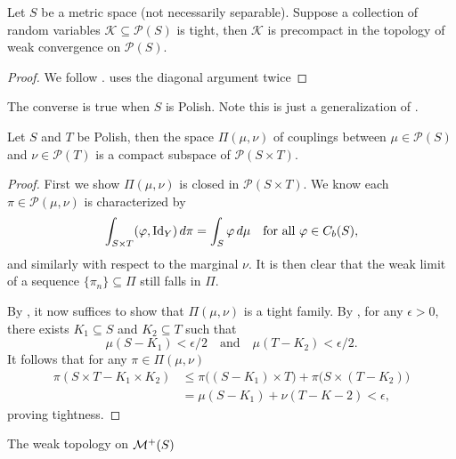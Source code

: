 \begin{namedthm} \label{label:Prohorov}
    Let $S$ be a metric space (not necessarily separable). Suppose a collection of random variables $\mathcal K \subseteq \mathcal P(S)$ is tight, then $\mathcal K$ is precompact in the topology of weak convergence on $\mathcal P(S)$.

    
\end{namedthm}
\begin{proof}
    We follow \cite[Theorem~23.2]{Kallenberg_2021}. \cite[Theorem~6.7]{DaPrato_2006} uses the diagonal argument twice 
\end{proof}

The converse is true when $S$ is Polish. Note this is just a generalization of .

\begin{cor} \cite[Corollary~2.9]{ABS_2024} \label{cor:compact-coupling-space-Polish}
    Let $S$ and $T$ be Polish, then the space $\Pi(\mu,\nu)$ of couplings between $\mu \in \mathcal P(S)$ and $\nu \in \mathcal P(T)$ is a compact subspace of $\mathcal P(S \times T)$.
\end{cor}
\begin{proof}
    First we show $\Pi(\mu,\nu)$ is closed in $\mathcal P(S \times T)$. We know each $\pi \in \mathcal P(\mu,\nu)$ is characterized by \[
        \int_{S \times T} (\varphi, \mathrm{Id}_Y) \,d\pi = \int_S \varphi\,d\mu\quad \text{for all }\varphi\in C_b(S),
    \] and similarly with respect to the marginal $\nu$. It is then clear that the weak limit of a sequence $\{\pi_n\} \subseteq \Pi$ still falls in $\Pi$.
    
    By , it now suffices to show that $\Pi(\mu,\nu)$ is a tight family. By , for any $\epsilon >0$, there exists $K_1 \subseteq S$ and $K_2 \subseteq T$ such that \[
        \mu(S - K_1) < \epsilon/2\quad \text{and} \quad \mu(T - K_2) < \epsilon/2.
    \] It follows that for any $\pi \in \Pi(\mu,\nu)$ \begin{align*}
        \pi (S \times T - K_1 \times K_2) & \leq \pi\bigl((S - K_1) \times T\bigr) + \pi\bigl(S \times (T - K_2)\bigr)\\
        & = \mu(S - K_1)  + \nu(T - K-2) < \epsilon,
    \end{align*} proving tightness.
\end{proof}

\begin{thm}
    The weak topology on $\mathcal{M}^+(S)$
\end{thm}

